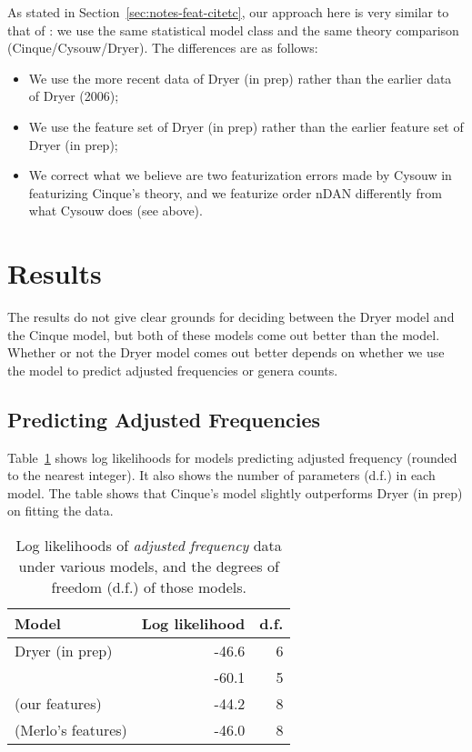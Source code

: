 \documentclass[11pt]{article}
\begin{document}
As stated in Section~\ref{sec:notes-feat-citetc}, our approach here is
very similar to that of \citet{cysouw2010dealing}: we use the same
statistical model class and the same theory comparison
(Cinque/Cysouw/Dryer).  The differences are as follows:
%
\begin{itemize}
\item We use the more recent data of Dryer (in prep) rather than the
  earlier data of Dryer (2006);
\item We use the feature set of Dryer (in prep) rather than the
  earlier feature set of Dryer (in prep);
\item We correct what we believe are two featurization errors made by
  Cysouw in featurizing Cinque's theory, and we featurize order nDAN
  differently from what Cysouw does (see above).
\end{itemize}


\section{Results}

The results do not give clear grounds for deciding between the Dryer model and the Cinque model, but both of these models come out better than the \citet{cysouw2010dealing} model. Whether or not the Dryer model comes out better depends on whether we use the model to predict adjusted frequencies or genera counts.

\subsection{Predicting Adjusted Frequencies}

Table~\ref{tab:af-likelihoods} shows log likelihoods for models predicting adjusted frequency (rounded to the nearest integer). It also shows the number of parameters (d.f.) in each model. The table shows that Cinque's model slightly outperforms Dryer (in prep) on fitting the data.

\begin{table}
  \centering
  \begin{tabular}{|l|r|r|}
    \hline
    Model & Log likelihood & d.f. \\
    \hline
    Dryer (in prep) & -46.6 & 6 \\
    \citet{cysouw2010dealing} & -60.1 & 5 \\
    \citet{cinque2005deriving} (our features) & -44.2 & 8 \\
    \citet{cinque2005deriving} (Merlo's features) & -46.0 & 8\\
    \hline
  \end{tabular}
  \caption{Log likelihoods of \emph{adjusted frequency} data under various models, and the degrees of freedom (d.f.) of those models.}
  \label{tab:af-likelihoods}
\end{table}
\end{document}
